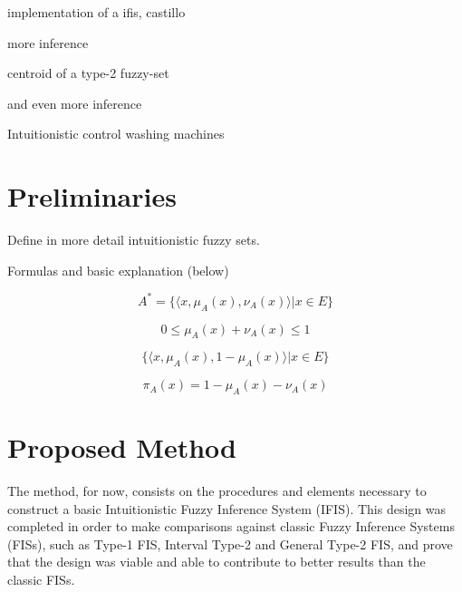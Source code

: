 \documentclass[conference]{IEEEtran}
\begin{document}
implementation of a ifis, castillo \cite{castillo2007intuitionistic}

more inference \cite{bustince1995method}

centroid of a type-2 fuzzy-set \cite{karnik2001centroid}

and even more inference \cite{marinov2005method}

Intuitionistic control washing machines \cite{akram2014intuitionistic}

\section{Preliminaries}

Define in more detail intuitionistic fuzzy sets. 

Formulas and basic explanation (below) \cite{atanassov2013intuitionistic}

\begin{equation}
  A^{*} = \{\langle x, \mu _{A} (x), \nu _{A} (x) \rangle | x \in E\}
\end{equation}

\begin{equation}
  \label{intuitionistic-interval}
  0 \leq \mu_{A}(x) + \nu_{A}(x) \leq 1
\end{equation}

\begin{equation}
  \label{ifs-form}
  \{ \langle x, \mu_{A}(x), 1 - \mu_{A}(x) \rangle | x \in E \}
\end{equation}

\begin{equation}
  \label{fs-as-ifs-if}
  \pi_{A}(x) = 1 - \mu_{A}(x) - \nu_{A}(x)
\end{equation}

\section{Proposed Method}

The method, for now, consists on the procedures and elements
necessary to construct a basic Intuitionistic Fuzzy Inference System
(IFIS). This design was completed in order to make comparisons against
classic Fuzzy Inference Systems (FISs), such as Type-1 FIS, Interval
Type-2 and General Type-2 FIS, and prove that
the design was viable and able to contribute to better results than
the classic FISs.
\end{document}
